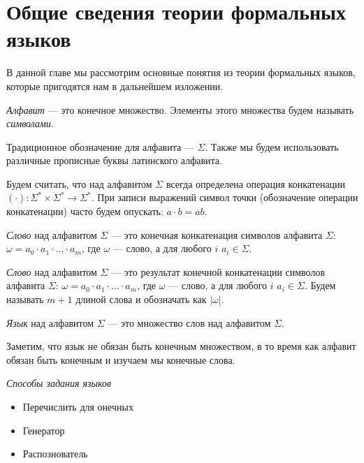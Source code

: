\section{Общие сведения теории формальных языков}

В данной главе мы рассмотрим основные понятия из теории формальных языков, которые пригодятся нам в дальнейшем изложении.

\begin{definition}
\textit{Алфавит} --- это конечное множество.
Элементы этого множества будем называть \textit{символами}.
\end{definition}

Традиционное обозначение для алфавита --- $\Sigma$.
Также мы будем использовать различные прописные буквы латинского алфавита.

Будем считать, что над алфавитом $\Sigma$ всегда определена операция конкатенации $(\cdot): \Sigma^* \times \Sigma^* \to \Sigma^*$.
При записи выражений символ точки (обозначение операции конкатенации) часто будем опускать: $a \cdot b = ab$.

\begin{definition}
\textit{Слово} над алфавитом $\Sigma$ --- это конечная конкатенация символов алфавита $\Sigma$: $\omega = a_0 \cdot a_1 \cdot \ldots \cdot a_m$, где $\omega$ --- слово, а для любого $i$ $a_i \in \Sigma$.
\end{definition}

\begin{definition}
\textit{Слово} над алфавитом $\Sigma$ --- это результат конечной конкатенации символов алфавита $\Sigma$: $\omega = a_0 \cdot a_1 \cdot \ldots \cdot a_m$, где $\omega$ --- слово, а для любого $i$ $a_i \in \Sigma$.
Будем называть $m + 1$ длиной слова и обозначать как $|\omega|$.
\end{definition}

\begin{definition}
\textit{Язык} над алфавитом $\Sigma$ --- это множество слов над алфавитом $\Sigma$.
\end{definition}

Заметим, что язык не обязан быть конечным множеством, в то время как алфавит обязан быть конечным и изучаем мы конечные слова.

\begin{definition}
\textit{Способы задания языков}
\begin{itemize}
\item Перечислить для онечных
\item Генератор
\item Распознователь
\end{itemize}

\end{definition}


